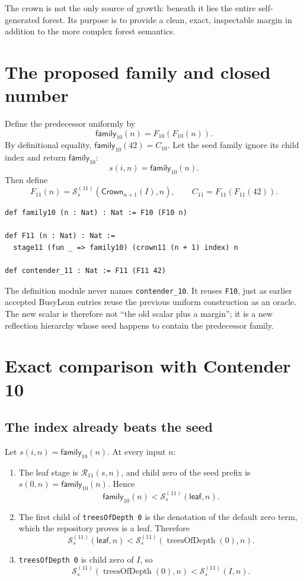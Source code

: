 \documentclass[11pt]{article}
\theoremstyle{definition}
\theoremstyle{remark}
\newcommand{\code}[1]{\texttt{#1}}
\newcommand{\R}{\mathcal{R}_{11}}
\newcommand{\Sstage}{\mathcal{S}^{(11)}}
\newcommand{\Crown}{\mathsf{Crown}}
\newcommand{\FamTen}{\mathsf{family}_{10}}
\newcommand{\Feleven}{F_{11}}
\newcommand{\ContEleven}{C_{11}}
\newcommand{\ContTen}{C_{10}}
\begin{document}
The crown is not the only source of growth: beneath it lies the entire
self-generated forest.  Its purpose is to provide a clean, exact, inspectable
margin in addition to the more complex forest semantics.

\section{The proposed family and closed number}

Define the predecessor uniformly by
\[
  \FamTen(n)=F_{10}(F_{10}(n)).
\]
By definitional equality, $\FamTen(42)=\ContTen$.  Let the seed family ignore
its child index and return $\FamTen$:
\[
  s(i,n)=\FamTen(n).
\]
Then define
\[
  \Feleven(n)=\Sstage_s(\Crown_{n+1}(I),n),
  \qquad
  \ContEleven=\Feleven(\Feleven(42)).
\]

\begin{lstlisting}
def family10 (n : Nat) : Nat := F10 (F10 n)

def F11 (n : Nat) : Nat :=
  stage11 (fun _ => family10) (crown11 (n + 1) index) n

def contender_11 : Nat := F11 (F11 42)
\end{lstlisting}

The definition module never names \code{contender\_10}.  It reuses
\code{F10}, just as earlier accepted BusyLean entries reuse the previous
uniform construction as an oracle.  The new scalar is therefore not
``the old scalar plus a margin''; it is a new reflection hierarchy whose seed
happens to contain the predecessor family.

\section{Exact comparison with Contender 10}

\subsection{The index already beats the seed}

Let $s(i,n)=\FamTen(n)$.  At every input $n$:

\begin{enumerate}
\item The leaf stage is $\R(s,n)$, and child zero of the seed prefix is
$s(0,n)=\FamTen(n)$.  Hence
\[
  \FamTen(n)<\Sstage_s(\mathsf{leaf},n).
\]
\item The first child of \code{treesOfDepth 0} is the denotation of the default
zero term, which the repository proves is a leaf.  Therefore
\[
  \Sstage_s(\mathsf{leaf},n)
  <\Sstage_s(\operatorname{treesOfDepth}(0),n).
\]
\item \code{treesOfDepth 0} is child zero of $I$, so
\[
  \Sstage_s(\operatorname{treesOfDepth}(0),n)
  <\Sstage_s(I,n).
\]
\end{enumerate}
\end{document}
